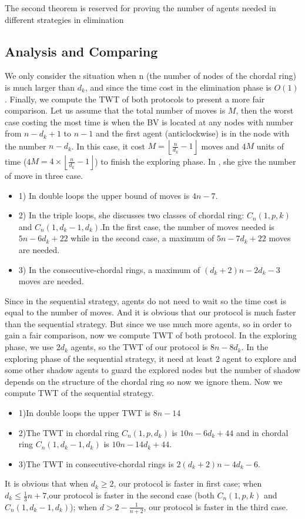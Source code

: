 The second theorem is reserved for proving the number of agents needed in different strategies in elimination
 
\subsection{Analysis and Comparing}

We only consider the situation when n (the number of nodes of the chordal ring) is much larger than $d_k$, and since the time cost in the elimination phase is $O(1)$.  Finally, we compute the TWT of both protocols to present a more fair comparison.
Let us assume that the total number of moves is $M$, then the worst case costing the most time is when the BV is located at any nodes with number from $n-d_k+1$ to $n-1$ and the first agent (anticlockwise) is in the node with the number $n-d_k$. In this case, it cost $M=\left \lfloor \frac{n}{d_k}-1\right \rfloor$ moves and 4$M$ units of time (4$M=4\times \left \lfloor \frac{n}{d_k}-1\right \rfloor$) to finish the exploring phase. 
In \cite{Alotaibi}, she give the number of move in three case.
\begin{itemize}
\item 1) In double loops the upper bound of moves is $4n-7$.
\item 2) In the triple loops, she discusses two classes of chordal ring: $C_n(1,p,k)$ and $C_n(1,d_k-1,d_k)$.In the first case, the number of moves needed is $5n-6d_k+22$ while in the second case, a maximum of $5n-7d_k+22$ moves are needed.
\item 3) In the consecutive-chordal rings, a maximum of $(d_k+2)n-2d_k-3$ moves are needed.
\end{itemize}
Since in the sequential strategy, agents do not need to wait so the time cost is equal to the number of moves. And it is obvious that our protocol is much faster than the sequential strategy. But since we use much more agents, so in order to gain a fair comparison, now we compute TWT of both protocol.
In the exploring phase, we use $2d_k$ agents, so the TWT of our protocol is $8n-8d_k$. In the exploring phase of the sequential strategy, it need at least 2 agent to explore and some other shadow agents to guard the explored nodes but the number of shadow depends on the structure of the chordal ring so now we ignore them. Now we compute TWT of the sequential strategy.
\begin{itemize}
\item 1)In double loops the upper TWT is $8n-14$
\item 2)The TWT in chordal ring $C_n(1,p,d_k)$ is $10n-6d_k+44$ and in chordal ring $C_n(1,d_k-1,d_k)$ is $10n-14d_k+44$.
\item 3)The TWT in consecutive-chordal rings is $2(d_k+2)n-4d_k-6$.
\end{itemize}
It is obvious that when $d_k\geq 2$, our protocol is faster in first case; when $d_k\leq \frac{1}{3}n+7$,our protocol is faster in the second case (both $C_n(1,p,k)$ and $C_n(1,d_k-1,d_k)$); when $d>2-\frac{1}{n+2}$, our protocol is faster in the third case.

